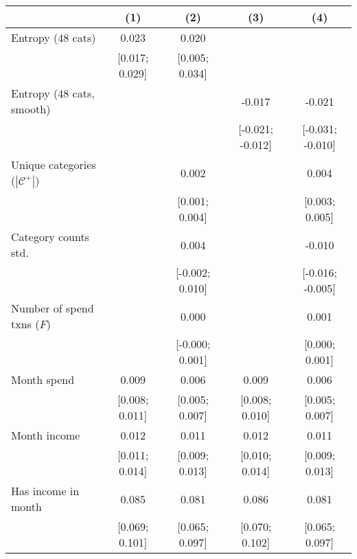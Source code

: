 
\begingroup
\centering
\begin{tabular}{lcccc}
   \toprule
                                          & (1)            & (2)             & (3)              & (4)\\  
   \midrule 
   Entropy (48 cats)                      & 0.023          & 0.020           &                  &   \\   
                                          & [0.017; 0.029] & [0.005; 0.034]  &                  &   \\   
   Entropy (48 cats, smooth)              &                &                 & -0.017           & -0.021\\   
                                          &                &                 & [-0.021; -0.012] & [-0.031; -0.010]\\   
   Unique categories ($|\mathcal{C}^+|$)  &                & 0.002           &                  & 0.004\\   
                                          &                & [0.001; 0.004]  &                  & [0.003; 0.005]\\   
   Category counts std.                   &                & 0.004           &                  & -0.010\\   
                                          &                & [-0.002; 0.010] &                  & [-0.016; -0.005]\\   
   Number of spend txns ($F$)             &                & 0.000           &                  & 0.001\\   
                                          &                & [-0.000; 0.001] &                  & [0.000; 0.001]\\   
   Month spend                            & 0.009          & 0.006           & 0.009            & 0.006\\   
                                          & [0.008; 0.011] & [0.005; 0.007]  & [0.008; 0.010]   & [0.005; 0.007]\\   
   Month income                           & 0.012          & 0.011           & 0.012            & 0.011\\   
                                          & [0.011; 0.014] & [0.009; 0.013]  & [0.010; 0.014]   & [0.009; 0.013]\\   
   Has income in month                    & 0.085          & 0.081           & 0.086            & 0.081\\   
                                          & [0.069; 0.101] & [0.065; 0.097]  & [0.070; 0.102]   & [0.065; 0.097]\\   

\end{tabular}
